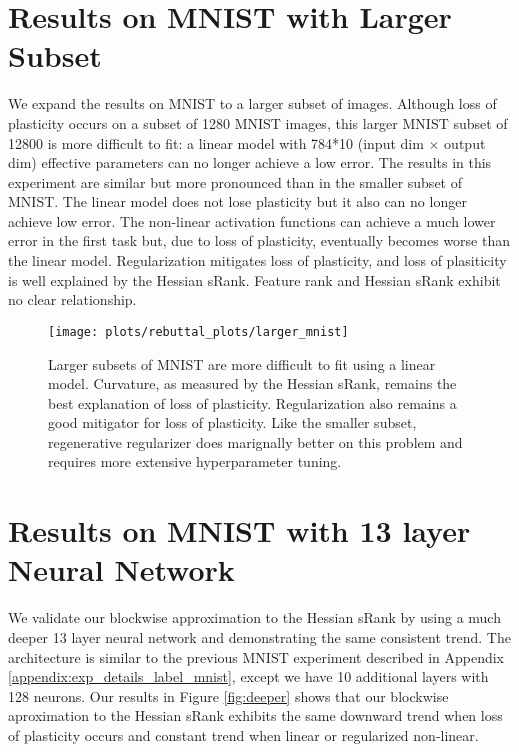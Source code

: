 \clearpage

\section{Results on MNIST with Larger Subset}
We expand the results on MNIST to a larger subset of images. Although loss of plasticity occurs on a subset of 1280 MNIST images, this larger MNIST subset of 12800 is more difficult to fit: a linear model with 784*10 (input dim $\times$ output dim) effective parameters can no longer achieve a low error.
The results in this experiment are similar but more pronounced than in the smaller subset of MNIST. The linear model does not lose plasticity but it also can no longer achieve low error. The non-linear activation functions can achieve a much lower error in the first task but, due to loss of plasticity, eventually becomes worse than the linear model. Regularization mitigates loss of plasticity, and loss of plasiticity is well explained by the Hessian sRank. Feature rank and Hessian sRank exhibit no clear relationship.

\begin{figure}[h!]
  \centering
  \texttt{[image: plots/rebuttal\_plots/larger\_mnist]}
  \caption{
      Larger subsets of MNIST are more difficult to fit using a linear model. Curvature, as measured by the Hessian sRank, remains the best explanation of loss of plasticity. Regularization also remains a good mitigator for loss of plasticity. Like the smaller subset, regenerative regularizer does marignally better on this problem and requires more extensive hyperparameter tuning.
  }
  \label{fig:larger_mnist}
\end{figure}

\clearpage

\section{Results on MNIST with 13 layer Neural Network}

We validate our blockwise approximation to the Hessian sRank by using a much deeper 13 layer neural network and demonstrating the same consistent trend.
The architecture is similar to the previous MNIST experiment described in Appendix \ref{appendix:exp_details_label_mnist}, except we have 10 additional layers with 128 neurons.
Our results in Figure \ref{fig:deeper} shows that our blockwise aproximation to the Hessian sRank exhibits the same downward trend when loss of plasticity occurs and constant trend when linear or regularized non-linear.


